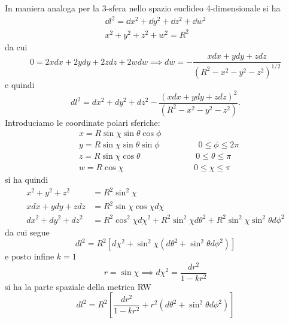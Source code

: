 In maniera analoga per la 3-sfera nello spazio euclideo 4-dimensionale si ha
\begin{subequations}
  \begin{gather}
    \dd l^2 = \dd x^2 + \dd y^2 + \dd z^2 + \dd w^2 \\
    x^2+y^2+z^2+w^2=R^2
  \end{gather}
\end{subequations}
da cui
\begin{equation}
  0 = 2 x dx + 2 y dy+ 2z dz + 2w dw \implies dw = - \frac {xdx+ydy+zdz}{\left(
      R^2-x^2-y^2-z^2 \right)^{1/2}}
\end{equation}
e quindi
\begin{equation}
dl^2 = dx^2+dy^2+dz^2 - \frac{ \left( xdx+ydy+zdz \right)^2}{\left(
    R^2-x^2-y^2-z^2 \right)}.
\end{equation}
Introduciamo le coordinate polari sferiche:
\begin{equation}
  \begin{split}
    & x=R \sin \chi \sin \theta \cos \phi                 \\
    & y=R \sin \chi \sin \theta \sin \phi~~~~~~~~~~~~~~~~~~~~~0\le \phi  \le 2 \pi \\
    & z=R \sin \chi \cos \theta~~~~~~~~~~~~~~~~~~~~~~~~~~~~~~0\le \theta \le \pi \\
    & w=R \cos \chi ~~~~~~~~~~~~~~~~~~~~~~~~~~~~~~~~~~~~~~0\le \chi \le \pi
\end{split}
\end{equation}
si ha quindi
\begin{subequations}
  \begin{align}
    x^2 + y^2 + z^2     & = R^2 \sin^2 \chi \\
    x dx + y dy + z dz  & = R^2 \sin \chi \cos \chi d \chi \\
    dx^2 + dy^2 + dz^2 & = R^2 \cos^2 \chi d \chi^2 + R^2 \sin^2 \chi d \theta^2
                         + R^2 \sin^2 \chi \sin^2 \theta d \phi^2
  \end{align}
\end{subequations}
da cui segue
\begin{equation}
  dl^2 = R^2 \left[ d \chi^2 + \sin^2 \chi \left( d \theta^2 + \sin^2 \theta d
      \phi^2 \right) \right]
\end{equation}
e posto infine $k=1$
\begin{equation}
  r= \sin \chi \implies d \chi^2 = \frac{dr^2}{1-kr^2}
\end{equation}
si ha la parte spaziale della metrica RW
\begin{equation}
  dl^2 = R^2 \left[ \frac{dr^2} {1-kr^2} + r^2 (d \theta^2+\sin^2 \theta d\phi^2) \right]
\end{equation}

